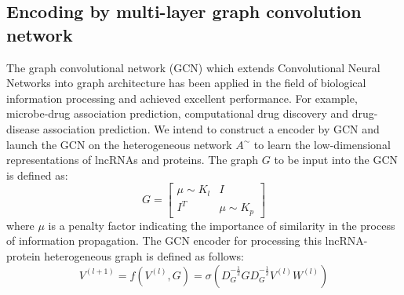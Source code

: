 \documentclass[fleqn,10pt]{wlscirep}
\begin{document}
\subsection*{Encoding by multi-layer graph convolution network}
The graph convolutional network (GCN) which extends Convolutional Neural Networks into graph architecture has been applied in the field of biological information processing and achieved excellent performance. For example, %
microbe-drug association prediction\cite{Long2020d}, computational drug discovery\cite{Sun2020b} and drug-disease association prediction\cite{Yu2020d}.
We intend to construct a encoder by GCN and launch the GCN on the heterogeneous network ${A^ \sim }$ to learn the low-dimensional representations of lncRNAs and proteins. The graph $G$ to be input into the GCN is defined as:
\begin{equation}\label{eq:inputG}
G = \left[ {\begin{array}{*{20}{c}}
{\mu  \sim {K_l}}&I\\
{{I^T}}&{\mu  \sim {K_p}}
\end{array}} \right]
\end{equation}
where $\mu$ is a penalty factor indicating the importance of similarity in the process of information propagation. 
The GCN encoder for processing this lncRNA-protein heterogeneous graph is defined as follows:
\begin{equation}\label{eq:encoder}
{V^{(l + 1)}} = f({V^{(l)}},G) = \sigma ({D_G^{ - \frac{1}{2}}}G{D_G^{ - \frac{1}{2}}}{V^{(l)}}{W^{(l)}})
\end{equation}
\end{document}
